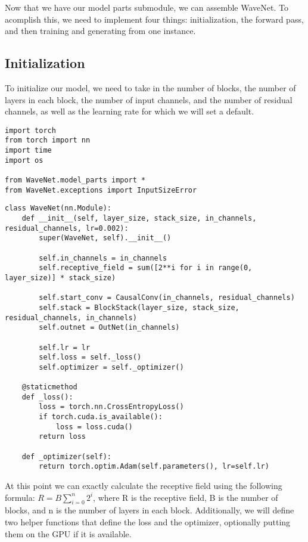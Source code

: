 Now that we have our model parts submodule, we can assemble WaveNet. To acomplish this, we need to implement four things: initialization, the forward pass, and then training and generating from one instance.

\subsection{Initialization}

To initialize our model, we need to take in the number of blocks, the number of layers in each block, the number of input channels, and the number of residual channels, as well as the learning rate for which we will set a default. 

\begin{verbatim}
import torch
from torch import nn
import time
import os

from WaveNet.model_parts import *
from WaveNet.exceptions import InputSizeError

\end{verbatim}
\newpage

\begin{verbatim}
class WaveNet(nn.Module):
    def __init__(self, layer_size, stack_size, in_channels, residual_channels, lr=0.002):
        super(WaveNet, self).__init__()

        self.in_channels = in_channels
        self.receptive_field = sum([2**i for i in range(0, layer_size)] * stack_size)
        
        self.start_conv = CausalConv(in_channels, residual_channels)
        self.stack = BlockStack(layer_size, stack_size, residual_channels, in_channels)
        self.outnet = OutNet(in_channels)
        
        self.lr = lr
        self.loss = self._loss()
        self.optimizer = self._optimizer()

    @staticmethod
    def _loss():
        loss = torch.nn.CrossEntropyLoss()
        if torch.cuda.is_available():
            loss = loss.cuda()
        return loss

    def _optimizer(self):
        return torch.optim.Adam(self.parameters(), lr=self.lr)
\end{verbatim}

At this point we can exactly calculate the receptive field using the following formula: $R = B\sum^n_{i=0}2^i$, where R is the receptive field, B is the number of blocks, and n is the number of layers in each block. Additionally, we will define two helper functions that define the loss and the optimizer, optionally putting them on the GPU if it is available.

